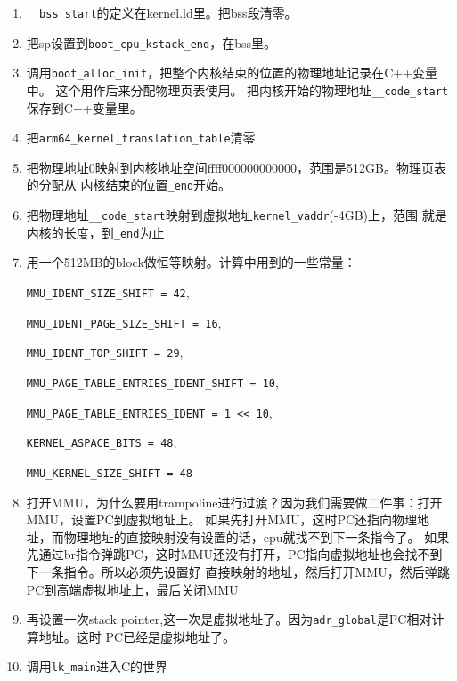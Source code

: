 \begin{enumerate}
    \item \verb!__bss_start!的定义在kernel.ld里。把bss段清零。
    \item 把sp设置到\verb!boot_cpu_kstack_end!，在bss里。

    \item 调用\verb!boot_alloc_init!，把整个内核结束的位置的物理地址记录在C++变量中。
          这个用作后来分配物理页表使用。
          把内核开始的物理地址\verb!__code_start!保存到C++变量里。

    \item 把\verb!arm64_kernel_translation_table!清零

    \item 把物理地址0映射到内核地址空间ffff000000000000，范围是512GB。物理页表的分配从
          内核结束的位置\verb!_end!开始。

    \item 把物理地址\verb!__code_start!映射到虚拟地址\verb!kernel_vaddr!(-4GB)上，范围
    就是内核的长度，到\verb!_end!为止

    \item 用一个512MB的block做恒等映射。计算中用到的一些常量：

        \verb!MMU_IDENT_SIZE_SHIFT = 42!, 

        \verb!MMU_IDENT_PAGE_SIZE_SHIFT = 16!, 

        \verb!MMU_IDENT_TOP_SHIFT = 29!, 

        \verb!MMU_PAGE_TABLE_ENTRIES_IDENT_SHIFT = 10!, 

        \verb!MMU_PAGE_TABLE_ENTRIES_IDENT = 1 << 10!, 
        
        \verb!KERNEL_ASPACE_BITS = 48!, 

        \verb!MMU_KERNEL_SIZE_SHIFT = 48! 

    \item 打开MMU，为什么要用trampoline进行过渡？因为我们需要做二件事：打开MMU，设置PC到虚拟地址上。
    如果先打开MMU，这时PC还指向物理地址，而物理地址的直接映射没有设置的话，cpu就找不到下一条指令了。
    如果先通过br指令弹跳PC，这时MMU还没有打开，PC指向虚拟地址也会找不到下一条指令。所以必须先设置好
    直接映射的地址，然后打开MMU，然后弹跳PC到高端虚拟地址上，最后关闭MMU

    \item 再设置一次stack pointer,这一次是虚拟地址了。因为\verb!adr_global!是PC相对计算地址。这时
    PC已经是虚拟地址了。

    \item 调用\verb!lk_main!进入C的世界

\end{enumerate}

